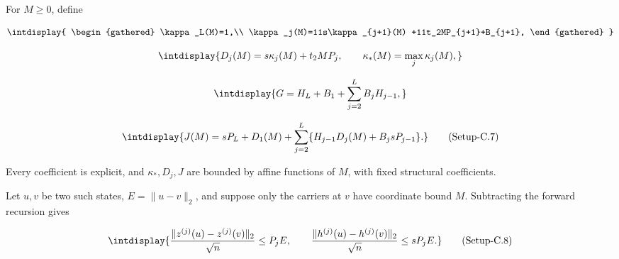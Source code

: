 
For \(M\ge0\), define


\begingroup\renewcommand{\theHequation}{intdisplay.921}
\begin{equation*}
\intdisplay{
\begin{gathered}
\kappa_L(M)=1,\\
\kappa_j(M)=11s\kappa_{j+1}(M)
           +11t_2MP_{j+1}+B_{j+1},
\end{gathered}
}
\end{equation*}
\endgroup

\begingroup\renewcommand{\theHequation}{intdisplay.922}
\begin{equation*}
\intdisplay{
D_j(M)=s\kappa_j(M)+t_2MP_j,\qquad
\kappa_*(M)=\max_j\kappa_j(M),
}
\end{equation*}
\endgroup

\begingroup\renewcommand{\theHequation}{intdisplay.923}
\begin{equation*}
\intdisplay{
G=H_L+B_1+\sum_{j=2}^LB_jH_{j-1},
}
\end{equation*}
\endgroup

\label{int:eq-setup-c-7}
\begingroup\renewcommand{\theHequation}{intdisplay.924}
\begin{equation}
\intdisplay{
J(M)=sP_L+D_1(M)+
\sum_{j=2}^L\{H_{j-1}D_j(M)+B_jsP_{j-1}\}.
}
\tag{Setup-C.7}
\label{int:eq-0463-setup-c-7}
\end{equation}
\endgroup


Every coefficient is explicit, and \(\kappa_*,\allowbreak D_j,\allowbreak J\) are bounded by affine functions of \(M\), with fixed structural coefficients.



Let \(u,\allowbreak v\) be two such states, \(E=\|u-v\|_2\), and suppose only the carriers at \(v\) have coordinate bound \(M\). Subtracting the forward recursion gives


\label{int:eq-setup-c-8}
\begingroup\renewcommand{\theHequation}{intdisplay.925}
\begin{equation}
\intdisplay{
\frac{\|z^{(j)}(u)-z^{(j)}(v)\|_2}{\sqrt n}\le P_jE,
\qquad
\frac{\|h^{(j)}(u)-h^{(j)}(v)\|_2}{\sqrt n}\le sP_jE.
}
\tag{Setup-C.8}
\label{int:eq-0464-setup-c-8}
\end{equation}
\endgroup

